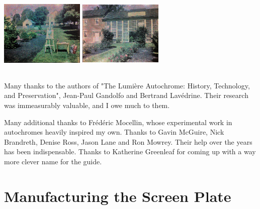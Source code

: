 \documentclass[11pt]{article}
\begin{document}
\begin{center}
\includegraphics[width=4cm, height=4cm]{img/intro_7.jpg}
\includegraphics[width=4cm, height=4cm]{img/intro_8.jpg}
\end{center}


Many thanks to the authors of "The Lumière Autochrome: History, Technology, and Preservation", Jean-Paul Gandolfo and Bertrand Lavédrine. Their research was immeasurably valuable, and I owe much to them.\newline

Many additional thanks to Frédéric Mocellin, whose experimental work in autochromes heavily inspired my own. Thanks to Gavin McGuire, Nick Brandreth, Denise Ross, Jason Lane and Ron Mowrey. Their help over the years has been indispensable. Thanks to Katherine Greenleaf for coming up with a way more clever name for the guide.\newline

\pagebreak

\section{Manufacturing the Screen Plate}
\end{document}
